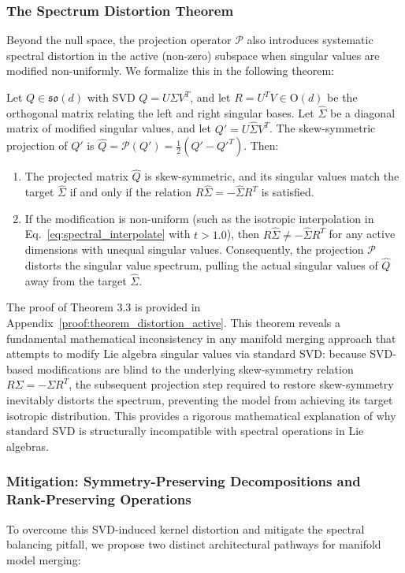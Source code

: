 \subsubsection{The Spectrum Distortion Theorem}
Beyond the null space, the projection operator $\mathcal{P}$ also introduces systematic spectral distortion in the active (non-zero) subspace when singular values are modified non-uniformly. We formalize this in the following theorem:

\begin{theorem}
Let $Q \in \mathfrak{so}(d)$ with SVD $Q = U \Sigma V^T$, and let $R = U^T V \in \mathrm{O}(d)$ be the orthogonal matrix relating the left and right singular bases. Let $\hat{\Sigma}$ be a diagonal matrix of modified singular values, and let $Q' = U \hat{\Sigma} V^T$. The skew-symmetric projection of $Q'$ is $\hat{Q} = \mathcal{P}(Q') = \frac{1}{2}(Q' - Q'^T)$.
Then:
\begin{enumerate}
    \item The projected matrix $\hat{Q}$ is skew-symmetric, and its singular values match the target $\hat{\Sigma}$ if and only if the relation $R \hat{\Sigma} = -\hat{\Sigma} R^T$ is satisfied.
    \item If the modification is non-uniform (such as the isotropic interpolation in Eq.~\ref{eq:spectral_interpolate} with $t > 1.0$), then $R \hat{\Sigma} \ne -\hat{\Sigma} R^T$ for any active dimensions with unequal singular values. Consequently, the projection $\mathcal{P}$ distorts the singular value spectrum, pulling the actual singular values of $\hat{Q}$ away from the target $\hat{\Sigma}$.
\end{enumerate}
\end{theorem}

The proof of Theorem 3.3 is provided in Appendix~\ref{proof:theorem_distortion_active}. This theorem reveals a fundamental mathematical inconsistency in any manifold merging approach that attempts to modify Lie algebra singular values via standard SVD: because SVD-based modifications are blind to the underlying skew-symmetry relation $R \Sigma = -\Sigma R^T$, the subsequent projection step required to restore skew-symmetry inevitably distorts the spectrum, preventing the model from achieving its target isotropic distribution. This provides a rigorous mathematical explanation of why standard SVD is structurally incompatible with spectral operations in Lie algebras.

\subsubsection{Mitigation: Symmetry-Preserving Decompositions and Rank-Preserving Operations}
To overcome this SVD-induced kernel distortion and mitigate the spectral balancing pitfall, we propose two distinct architectural pathways for manifold model merging:

